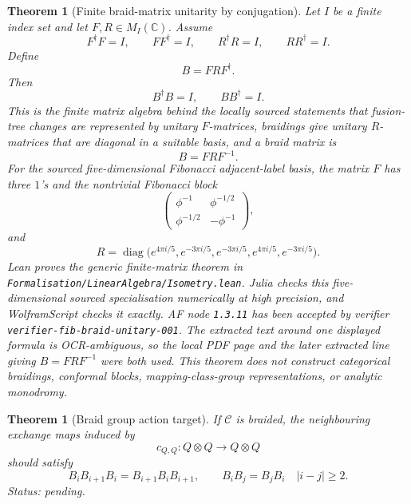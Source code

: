\documentclass[11pt]{article}
\newtheorem{theorem}[definition]{Theorem}
\begin{document}
\begin{theorem}[Finite braid-matrix unitarity by conjugation]
Let \(I\) be a finite index set and let \(F,R\in M_I(\mathbb C)\). Assume
\[
F^\dagger F=I,\qquad FF^\dagger=I,\qquad
R^\dagger R=I,\qquad RR^\dagger=I.
\]
Define
\[
B=F R F^\dagger .
\]
Then
\[
B^\dagger B=I,\qquad BB^\dagger=I.
\]
This is the finite matrix algebra behind the locally sourced statements that
fusion-tree changes are represented by unitary \(F\)-matrices, braidings give
unitary \(R\)-matrices that are diagonal in a suitable basis, and a braid
matrix is
\[
B=F R F^{-1}.
\]
For the sourced five-dimensional Fibonacci adjacent-label basis, the matrix
\(F\) has three \(1\)'s and the nontrivial Fibonacci block
\[
\begin{pmatrix}\phi^{-1}&\phi^{-1/2}\\
\phi^{-1/2}&-\phi^{-1}\end{pmatrix},
\]
and
\[
R=\operatorname{diag}\bigl(e^{4\pi i/5},e^{-3\pi i/5},e^{-3\pi i/5},
e^{4\pi i/5},e^{-3\pi i/5}\bigr).
\]
Lean proves the generic finite-matrix theorem in
\texttt{Formalisation/LinearAlgebra/Isometry.lean}. Julia checks this
five-dimensional sourced specialisation numerically at high precision, and
WolframScript checks it exactly. AF node \texttt{1.3.11} has been accepted by
verifier \texttt{verifier-fib-braid-unitary-001}. The extracted text around
one displayed formula is OCR-ambiguous, so the local PDF page and the later
extracted line giving \(B=FRF^{-1}\) were both used. This theorem does not
construct categorical braidings, conformal blocks, mapping-class-group
representations, or analytic monodromy.
\end{theorem}

\begin{theorem}[Braid group action target]
If \(\mathcal C\) is braided, the neighbouring exchange maps induced by
\[
c_{Q,Q}:Q\otimes Q\to Q\otimes Q
\]
should satisfy
\[
B_iB_{i+1}B_i=B_{i+1}B_iB_{i+1},\qquad
B_iB_j=B_jB_i\quad |i-j|\geq 2.
\]
Status: pending.
\end{theorem}
\end{document}
